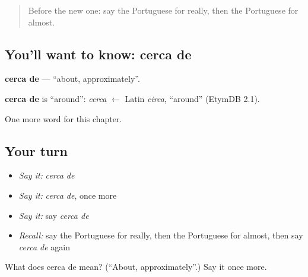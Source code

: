 \begin{quote}
Before the new one: say the Portuguese for really, then the Portuguese for almost.
\end{quote}

\subsection*{You'll want to know: cerca de}
\textbf{cerca de} — \textquotedblleft{}about, approximately\textquotedblright{}.

\begin{cousinweb}
\textbf{cerca de} is \textquotedblleft{}around\textquotedblright{}: \emph{cerca} $\leftarrow$ Latin \emph{circa}, \textquotedblleft{}around\textquotedblright{} (EtymDB 2.1).
\end{cousinweb}

\begin{grammarlens}[title={What you've built}]
One more word for this chapter.
\end{grammarlens}

\subsection*{Your turn}
\begin{itemize}
\raggedright
  \item \emph{Say it:} \emph{cerca de}
  \item \emph{Say it:} \emph{cerca de}, once more
  \item \emph{Say it:} say \emph{cerca de}
  \item \emph{Recall:} say the Portuguese for really, then the Portuguese for almost, then say \emph{cerca de} again
\end{itemize}

\begin{tcolorbox}[breakable,colback=teal!4,colframe=teal!35!black,title={Before you move on}]
What does cerca de mean? (\textquotedblleft{}About, approximately\textquotedblright{}.) Say it once more.
\end{tcolorbox}
